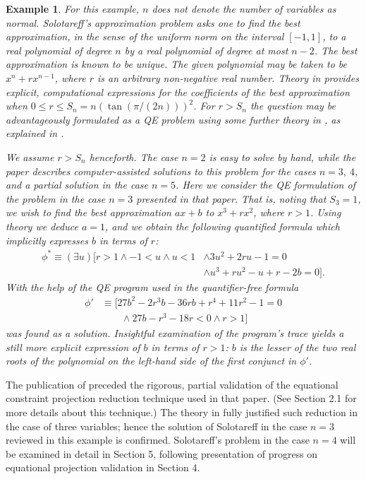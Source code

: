 \documentclass{article}
\newtheorem{example}{Example}
\begin{document}
\begin{example}
For this example, $n$ does not denote the number of variables as normal.  Solotareff's approximation problem \cite{Collins1996} asks one to find the best approximation, in the sense of the uniform norm on the interval $[-1,1]$, to a real polynomial of degree $n$ by a real polynomial  of degree at most $n-2$. The best approximation is known to be unique. The given polynomial may be taken to be $x^n + r x^{n-1}$, where $r$ is an arbitrary non-negative real number. Theory
in \cite{Achieser1956} provides explicit, computational expressions for the coefficients of the best approximation when 
$0 \le r \le S_n = n(\tan(\pi/(2n)))^2$. For $r > S_n$
the question may be advantageously formulated as a QE problem using some further theory in \cite{Achieser1956}, as explained in \cite{Collins1996}. 

We assume $r > S_n$ henceforth. The case $n=2$ is easy to solve by hand, while the paper \cite{Collins1996} describes computer-assisted solutions to this problem for the cases $n = 3,~4$, and a partial solution in the case $n=5$. Here we consider the QE formulation of the problem in the case $n=3$ presented in that paper. That is, noting that $S_3 = 1$, we wish to find the best approximation $ax + b$ to $x^3 + rx^2$, where $r > 1$. Using theory we deduce $a = 1$, and we obtain the following quantified formula which implicitly expresses $b$ in terms of $r$:
\begin{align*}
\phi^* \equiv (\exists u)[r > 1 \wedge -1 < u \wedge u < 1 
 &\wedge 3u^2 + 2ru - 1 = 0 \\
 & \wedge u^3 + ru^2 - u + r - 2b = 0].
\end{align*}
With the help of the QE program used in \cite{Collins1996} the quantifier-free formula
\begin{align*}
\phi' &\equiv [27b^2 - 2r^3 b - 36 rb + r^4 + 11r^2 - 1 = 0 \\
&\qquad  \wedge 27b - r^3 - 18r < 0 \wedge r > 1]
\end{align*}
was found as a solution. Insightful examination of the program's trace yields a still more explicit expression of $b$ in terms of $r > 1$: $b$ is the lesser of the two real roots of the polynomial on the left-hand side of the first conjunct in $\phi'$.
\end{example}
The publication of \cite{Collins1996} preceded the rigorous, partial validation of the equational constraint projection reduction technique used in that paper. (See Section 2.1 for more details about this technique.) The theory in \cite{McCallum1999} fully justified such reduction in the case of three variables; hence the solution of Solotareff in the case $n = 3$ reviewed in this example is confirmed. 
Solotareff's problem in the case $n = 4$ will be examined in detail in Section 5, following presentation of progress on equational projection validation in Section 4.
\end{document}
